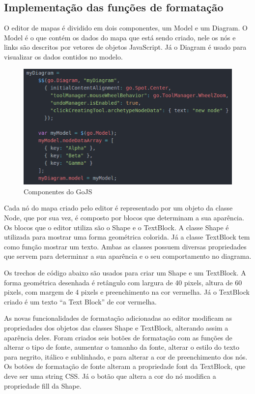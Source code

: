 \documentclass[
	12pt,				%
	openright,			%
	oneside,			%
	a4paper,			%
	english,			%
	french,				%
	spanish,			%
	brazil				%
	]{abntex2}
\begin{document}
\subsection{Implementação das funções de formatação}
O editor de mapas é dividido em dois componentes, um Model e um Diagram. O Model é o que contém os dados do mapa que está sendo criado, nele os nós e links são descritos por vetores de objetos JavaScript. Já o Diagram é usado para visualizar os dados contidos no modelo.
\begin{figure}[htb]
	\caption{\label{fig_gojs} Componentes do GoJS}
	\begin{center}
		\includegraphics[scale=0.7]{gojs.png}
	\end{center}
\end{figure}

Cada nó do mapa criado pelo editor é representado por um objeto da classe Node, que por sua vez, é composto por blocos que determinam a sua aparência. Os blocos que o editor utiliza são o Shape e o TextBlock. A classe Shape é utilizada para mostrar uma forma geométrica colorida. Já a classe TextBlock tem como função mostrar um texto. Ambas as classes possuem diversas propriedades que servem para determinar a sua aparência e o seu comportamento no diagrama.

Os trechos de código abaixo são usados para criar um Shape e um TextBlock. A forma geométrica  desenhada é retângulo com largura de 40 pixels, altura de 60 pixels, com margem de 4 pixels e preenchimento na cor vermelha. Já o TextBlock criado é um texto “a Text Block” de cor vermelha.

As novas funcionalidades de formatação adicionadas ao editor modificam as propriedades dos objetos das classes Shape e TextBlock, alterando assim a aparência deles. Foram criados seis botões de formatação com as funções de alterar o tipo de fonte, aumentar o tamanho da fonte, alterar o estilo do texto para negrito, itálico e sublinhado, e para alterar a cor de preenchimento dos nós. Os botões de formatação de fonte alteram a propriedade font da TextBlock, que deve ser uma string  CSS. Já o botão que altera a cor do nó modifica a propriedade fill da Shape.
\end{document}
